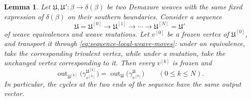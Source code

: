 \documentclass[12pt, reqno]{amsart}
\theoremstyle{plain}
\newtheorem{lemma}[theorem]{Lemma}
\theoremstyle{definition}
\numberwithin{equation}{section}
\begin{document}
\begin{lemma}\label{lem:output}
Let \(\mathfrak U,\mathfrak U'\colon
\beta\longrightarrow\delta(\beta)\) be two Demazure weaves with the
same fixed expression of \(\delta(\beta)\) on their southern
boundaries. Consider a sequence
\begin{equation}\label{eq:sequence-local-weave-moves}
    \mathfrak U=\mathfrak U^{[0]}
    \longrightarrow\mathfrak U^{[1]}
    \longrightarrow\cdots
    \longrightarrow\mathfrak U^{[N]}=\mathfrak U'
\end{equation}
of weave equivalences and weave mutations. Let \(v^{[0]}\) be a
frozen vertex of \(\mathfrak U^{[0]}\), and transport it through
\eqref{eq:sequence-local-weave-moves}: under an equivalence, take the
corresponding trivalent vertex, while under a mutation, take the
unchanged vertex corresponding to it. Then every \(v^{[k]}\) is
frozen and
\begin{equation}\label{eq:output-vector-invariance}
    \operatorname{out}_{\mathfrak U^{[k]}}
    \bigl(\gamma_{v^{[k]}}^{\mathfrak U^{[k]}}\bigr)
    =
    \operatorname{out}_{\mathfrak U}
    \bigl(\gamma_{v^{[0]}}^{\mathfrak U}\bigr)
    \qquad(0\leq k\leq N).
\end{equation}
In particular, the cycles at the two ends of the sequence have the
same output vector.
\end{lemma}
\end{document}
